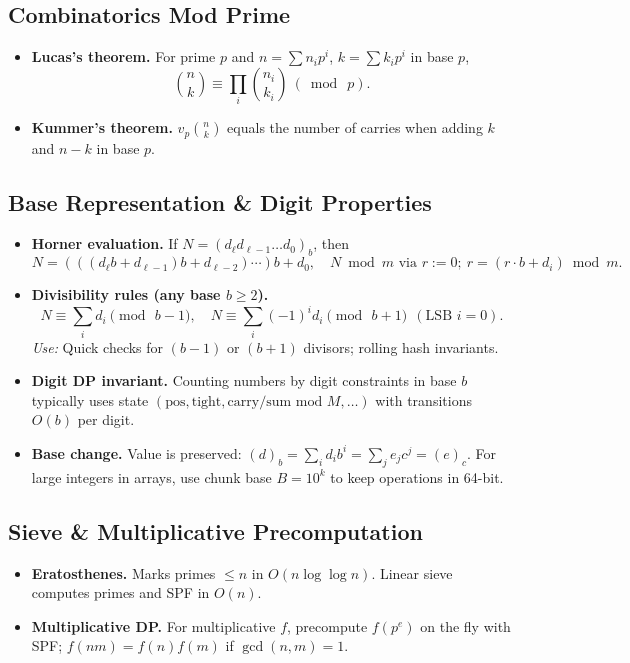 \documentclass[10pt]{article}
\theoremstyle{definition}
\begin{document}
\subsection{Combinatorics Mod Prime}
\begin{itemize}
  \item \textbf{Lucas's theorem.} For prime $p$ and $n=\sum n_i p^i$, $k=\sum k_i p^i$ in base $p$,
  \[
    \binom{n}{k}\equiv \prod_i \binom{n_i}{k_i}\ (\bmod\ p).
  \]
  \item \textbf{Kummer's theorem.} $v_p\!\binom{n}{k}$ equals the number of carries when adding $k$ and $n-k$ in base $p$.
\end{itemize}

\subsection{Base Representation \& Digit Properties}
\begin{itemize}
  \item \textbf{Horner evaluation.} If $N=(d_\ell d_{\ell-1}\dots d_0)_b$, then
  \[
    N = (((d_\ell b + d_{\ell-1})b + d_{\ell-2})\cdots)b + d_0, \quad
    N \bmod m \text{ via } r:=0;\ r=(r\cdot b + d_i)\bmod m.
  \]
  \item \textbf{Divisibility rules (any base $b\ge 2$).}
  \[
    N \equiv \sum_i d_i \pmod{\,b-1},\quad
    N \equiv \sum_i (-1)^i d_i \pmod{\,b+1}\ \ (\text{LSB }i=0).
  \]
  \emph{Use:} Quick checks for $(b-1)$ or $(b+1)$ divisors; rolling hash invariants.
  \item \textbf{Digit DP invariant.} Counting numbers by digit constraints in base $b$ typically uses state $(\text{pos},\text{tight},\text{carry/sum mod }M,\dots)$ with transitions $O(b)$ per digit.
  \item \textbf{Base change.} Value is preserved: $(d)_b=\sum_i d_i b^i=\sum_j e_j c^j = (e)_c$. For large integers in arrays, use chunk base $B=10^k$ to keep operations in 64-bit.
\end{itemize}

\subsection{Sieve \& Multiplicative Precomputation}
\begin{itemize}
  \item \textbf{Eratosthenes.} Marks primes $\le n$ in $O(n\log\log n)$. Linear sieve computes primes and SPF in $O(n)$.
  \item \textbf{Multiplicative DP.} For multiplicative $f$, precompute $f(p^e)$ on the fly with SPF; $f(nm)=f(n)f(m)$ if $\gcd(n,m)=1$.
\end{itemize}
\end{document}
